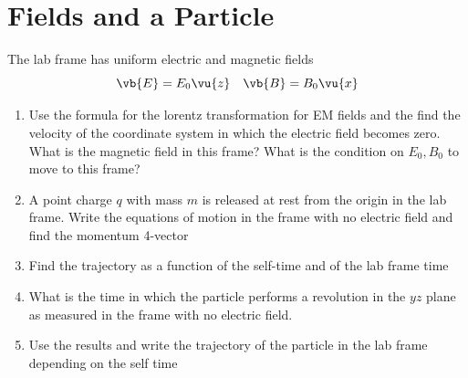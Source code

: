 \clearpage
\section{Fields and a Particle}
\begin{colbox}
  The lab frame has uniform electric and magnetic fields
  \begin{equation}
    \vb{E}=E_0\vu{z} \quad \vb{B}=B_0\vu{x}
  \end{equation}
  \begin{enumerate}
    \item Use the formula for the lorentz transformation for EM fields and the find the velocity of the coordinate system in which the electric field becomes zero. What is the magnetic field in this frame? What is the condition on \(E_0, B_0\) to move to this frame?
    \item A point charge \(q\) with mass \(m\) is released at rest from the origin in the lab frame. Write the equations of motion in the frame with no electric field and find the momentum 4-vector
    \item Find the trajectory as a function of the self-time and of the lab frame time
    \item What is the time in which the particle performs a revolution in the \(yz\) plane as measured in the frame with no electric field.
    \item Use the results and write the trajectory of the particle in the lab frame depending on the self time
  \end{enumerate}
\end{colbox}
